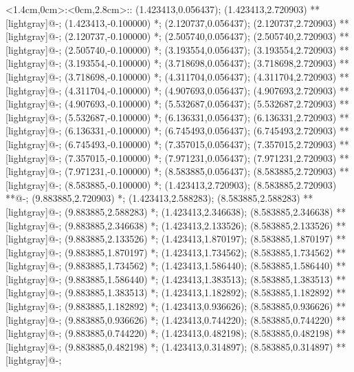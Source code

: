 \xy <1.4cm,0cm>:<0cm,2.8cm>::
(1.423413,0.056437); (1.423413,2.720903) **[lightgray]@{-};
(1.423413,-0.100000) *{};
(2.120737,0.056437); (2.120737,2.720903) **[lightgray]@{-};
(2.120737,-0.100000) *{};
(2.505740,0.056437); (2.505740,2.720903) **[lightgray]@{-};
(2.505740,-0.100000) *{};
(3.193554,0.056437); (3.193554,2.720903) **[lightgray]@{-};
(3.193554,-0.100000) *{};
(3.718698,0.056437); (3.718698,2.720903) **[lightgray]@{-};
(3.718698,-0.100000) *{};
(4.311704,0.056437); (4.311704,2.720903) **[lightgray]@{-};
(4.311704,-0.100000) *{};
(4.907693,0.056437); (4.907693,2.720903) **[lightgray]@{-};
(4.907693,-0.100000) *{};
(5.532687,0.056437); (5.532687,2.720903) **[lightgray]@{-};
(5.532687,-0.100000) *{};
(6.136331,0.056437); (6.136331,2.720903) **[lightgray]@{-};
(6.136331,-0.100000) *{};
(6.745493,0.056437); (6.745493,2.720903) **[lightgray]@{-};
(6.745493,-0.100000) *{};
(7.357015,0.056437); (7.357015,2.720903) **[lightgray]@{-};
(7.357015,-0.100000) *{};
(7.971231,0.056437); (7.971231,2.720903) **[lightgray]@{-};
(7.971231,-0.100000) *{};
(8.583885,0.056437); (8.583885,2.720903) **[lightgray]@{-};
(8.583885,-0.100000) *{};
(1.423413,2.720903); (8.583885,2.720903) **@{-};
(9.883885,2.720903) *{};
(1.423413,2.588283); (8.583885,2.588283) **[lightgray]@{-};
(9.883885,2.588283) *{};
(1.423413,2.346638); (8.583885,2.346638) **[lightgray]@{-};
(9.883885,2.346638) *{};
(1.423413,2.133526); (8.583885,2.133526) **[lightgray]@{-};
(9.883885,2.133526) *{};
(1.423413,1.870197); (8.583885,1.870197) **[lightgray]@{-};
(9.883885,1.870197) *{};
(1.423413,1.734562); (8.583885,1.734562) **[lightgray]@{-};
(9.883885,1.734562) *{};
(1.423413,1.586440); (8.583885,1.586440) **[lightgray]@{-};
(9.883885,1.586440) *{};
(1.423413,1.383513); (8.583885,1.383513) **[lightgray]@{-};
(9.883885,1.383513) *{};
(1.423413,1.182892); (8.583885,1.182892) **[lightgray]@{-};
(9.883885,1.182892) *{};
(1.423413,0.936626); (8.583885,0.936626) **[lightgray]@{-};
(9.883885,0.936626) *{};
(1.423413,0.744220); (8.583885,0.744220) **[lightgray]@{-};
(9.883885,0.744220) *{};
(1.423413,0.482198); (8.583885,0.482198) **[lightgray]@{-};
(9.883885,0.482198) *{};
(1.423413,0.314897); (8.583885,0.314897) **[lightgray]@{-};
